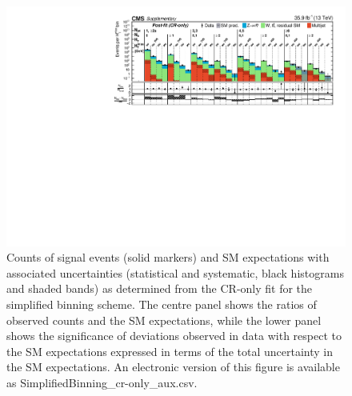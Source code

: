 \begin{figure}[h!]
  \centering
  \includegraphics[width=0.95\linewidth]{Supplementary/SimplifiedBinning_results_cr-only-fit_aux} 
  \caption{Counts of signal events (solid markers) and SM expectations
    with associated uncertainties (statistical and systematic, black
    histograms and shaded bands) 
    as determined from the CR-only fit
    for the simplified binning scheme.
    The centre panel shows the ratios of
    observed counts and the SM expectations, while the lower panel
    shows the significance of deviations observed in data with respect
    to the SM expectations expressed in terms of the total uncertainty
    in the SM expectations.
    An electronic version of this figure is available as SimplifiedBinning\_cr-only\_aux.csv.
    }
  \label{fig:aggregated_results_cr-only}
\end{figure}

